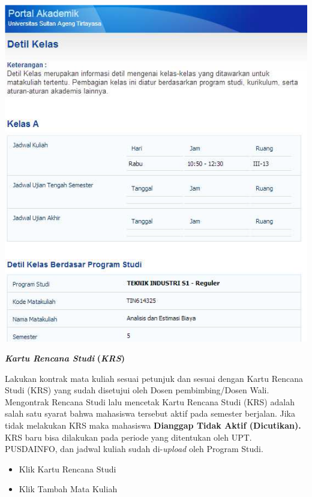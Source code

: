 \documentclass[
]{book}
\begin{document}
\begin{enumerate}
  \includegraphics{static/3.5.png}

  \textbf{\emph{Kartu Rencana Studi}} \textbf{(\emph{KRS})}

  Lakukan kontrak mata kuliah sesuai petunjuk dan sesuai dengan Kartu Rencana Studi (KRS) yang sudah disetujui oleh Dosen pembimbing/Dosen Wali. Mengontrak Rencana Studi lalu mencetak Kartu Rencana Studi (KRS) adalah salah satu syarat bahwa mahasiswa tersebut aktif pada semester berjalan. Jika tidak melakukan KRS maka mahasiswa \textbf{Dianggap Tidak Aktif (Dicutikan).} KRS baru bisa dilakukan pada periode yang ditentukan oleh UPT. PUSDAINFO, dan jadwal kuliah sudah di-\emph{upload} oleh Program Studi.

  \begin{itemize}
  \item
    Klik Kartu Rencana Studi
  \item
    Klik Tambah Mata Kuliah
  \end{itemize}


\end{enumerate}
\end{document}
